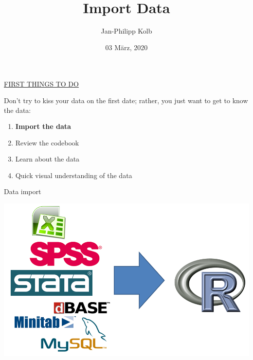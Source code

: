 \documentclass[
  10pt,
  ignorenonframetext,
]{beamer}
\title{Import Data}
\author{Jan-Philipp Kolb}
\date{03 März, 2020}
\providecommand{\tightlist}{%
  \setlength{\itemsep}{0pt}\setlength{\parskip}{0pt}}
\begin{document}
\frame{\titlepage}

\begin{frame}{\href{http://uc-r.github.io/data_wrangling/week-3}{FIRST
THINGS TO DO}}
\protect\hypertarget{first-things-to-do}{}

Don't try to kiss your data on the first date; rather, you just want to
get to know the data:

\begin{enumerate}
\tightlist
\item
  \textbf{Import the data}
\item
  Review the codebook
\item
  Learn about the data
\item
  Quick visual understanding of the data
\end{enumerate}

\end{frame}

\begin{frame}{Data import}
\protect\hypertarget{data-import}{}

\includegraphics{figure/Datenimport.PNG}

\end{frame}
\end{document}
